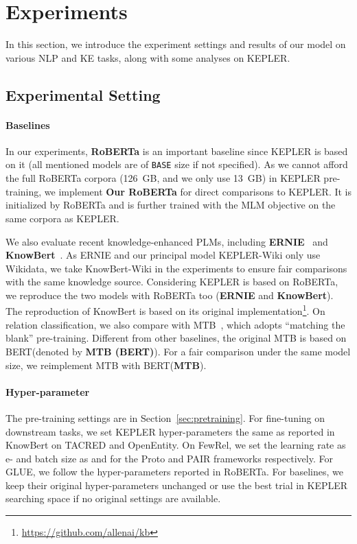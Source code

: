 \newcommand\ROBERTABASE{RoBERTa\xspace}
\newcommand\BERTBASE{BERT\xspace}
\newcommand\BERTLARGE{BERT\xspace}
\newcommand\RERNIE{ERNIE\xspace}
\newcommand\RKNOWBERT{KnowBert\xspace}
\section{Experiments}
\label{sec:exp}

In this section, we introduce the experiment settings and results of our model on various NLP and KE tasks, along with some analyses on KEPLER.

\subsection{Experimental Setting}
\label{sec:expsetting}


\paragraph{Baselines} In our experiments, \textbf{RoBERTa} is an important baseline since KEPLER is based on it (all mentioned models are of \texttt{BASE} size if not specified). 
As we cannot afford the full RoBERTa corpora (126~GB, and we only use 13~GB) in KEPLER pre-training, we implement \textbf{Our RoBERTa} for direct comparisons to KEPLER. It is initialized by \ROBERTABASE and is further trained with the MLM objective on the same corpora as KEPLER.

We also evaluate recent knowledge-enhanced PLMs, including \textbf{ERNIE}~\citep{zhang-etal-2019-ernie} and \textbf{KnowBert}~\citep{peters-etal-2019-knowledge}. 
As ERNIE and our principal model KEPLER-Wiki only use Wikidata, we take KnowBert-Wiki in the experiments to ensure fair comparisons with the same knowledge source. Considering KEPLER is based on RoBERTa, we reproduce the two models with RoBERTa too (\textbf{\RERNIE} and \textbf{\RKNOWBERT}). The reproduction of KnowBert is based on its original implementation\footnote{\url{https://github.com/allenai/kb}}. 
On relation classification, we also compare with MTB~\citep{baldini-soares-etal-2019-matching}, which adopts ``matching the blank'' pre-training. Different from other baselines, the original MTB is based on \BERTLARGE (denoted by \textbf{MTB (\BERTLARGE)}). For a fair comparison under the same model size, we reimplement MTB with \BERTBASE (\textbf{MTB}).

\paragraph{Hyper-parameter}
The pre-training settings are in Section~\ref{sec:pretraining}. For fine-tuning on downstream tasks, we set KEPLER hyper-parameters the same as reported in KnowBert on TACRED and OpenEntity. On FewRel, we set the learning rate as e- and batch size as  and  for the Proto and PAIR frameworks respectively. For GLUE, we follow the hyper-parameters reported in RoBERTa. For baselines, we keep their original hyper-parameters unchanged or use the best trial in KEPLER searching space if no original settings are available.

